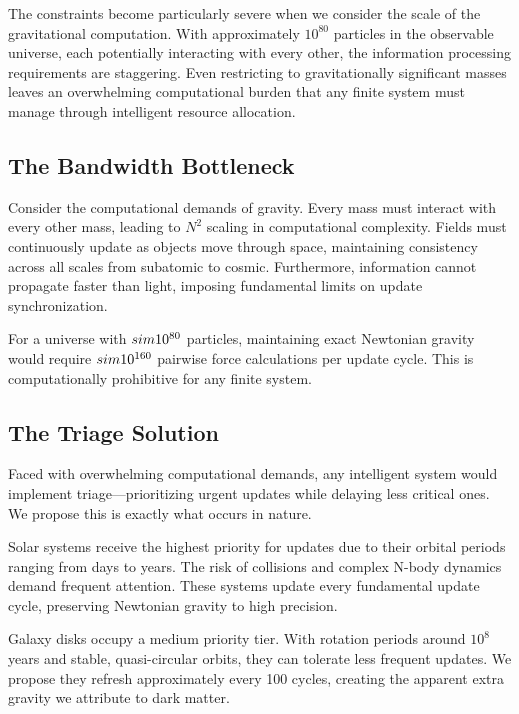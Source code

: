 \documentclass[twocolumn,prd,amsmath,amssymb,aps,superscriptaddress,nofootinbib]{revtex4-2}
\begin{document}
The constraints become particularly severe when we consider the scale of the gravitational computation. With approximately $10^{80}$ particles in the observable universe, each potentially interacting with every other, the information processing requirements are staggering. Even restricting to gravitationally significant masses leaves an overwhelming computational burden that any finite system must manage through intelligent resource allocation.

\subsection{The Bandwidth Bottleneck}

Consider the computational demands of gravity. Every mass must interact with every other mass, leading to $N^2$ scaling in computational complexity. Fields must continuously update as objects move through space, maintaining consistency across all scales from subatomic to cosmic. Furthermore, information cannot propagate faster than light, imposing fundamental limits on update synchronization.

For a universe with $\\sim 10^{80}$ particles, maintaining exact Newtonian gravity would require $\\sim 10^{160}$ pairwise force calculations per update cycle. This is computationally prohibitive for any finite system.

\subsection{The Triage Solution}

Faced with overwhelming computational demands, any intelligent system would implement triage---prioritizing urgent updates while delaying less critical ones. We propose this is exactly what occurs in nature.

Solar systems receive the highest priority for updates due to their orbital periods ranging from days to years. The risk of collisions and complex N-body dynamics demand frequent attention. These systems update every fundamental update cycle, preserving Newtonian gravity to high precision.

Galaxy disks occupy a medium priority tier. With rotation periods around $10^8$ years and stable, quasi-circular orbits, they can tolerate less frequent updates. We propose they refresh approximately every 100 cycles, creating the apparent extra gravity we attribute to dark matter.
\end{document}
